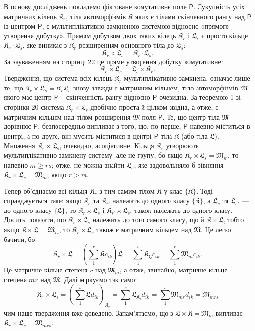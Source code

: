 \documentclass[11pt]{article}
\begin{document}
В основу досліджень покладемо фіксоване комутативне поле \(\mathsf P\). Сукупність усіх матричних кілець \(\mathfrak K_r\), тіла автоморфізмів \(\mathfrak K\) яких є тілами скінченного рангу над \(\mathsf P\) із центром \(\mathsf P\), є мультиплікативно замкненою системою відносно «прямого утворення добутку». Прямим добутком двох таких кілець \(\mathfrak K_r\) і \(\mathfrak L_s\) є просто кільце \(\mathfrak K_r\cdot\mathfrak L_s\), яке виникає з \(\mathfrak K_r\) розширенням основного тіла до \(\mathfrak L_s\):
\[
\mathfrak K_r\times\mathfrak L_s=\mathfrak K_r\cdot\mathfrak L_s.
\]
За зауваженням на сторінці 22 це пряме утворення добутку комутативне:
\[
\mathfrak K_r\times\mathfrak L_s=\mathfrak L_s\times\mathfrak K_r.
\]
Твердження, що система всіх кілець \(\mathfrak K_r\) мультиплікативно замкнена, означає лише те, що \(\mathfrak K_r\times\mathfrak L_s=\mathfrak K_r\mathfrak L_s\) знову завжди є матричним кільцем, тіло автоморфізмів \(\mathfrak M\) якого має центр \(\mathsf P\) -- скінченність рангу відносно \(\mathsf P\) очевидна. За теоремою 1 зі сторінки 20 система \(\mathfrak K_r\times\mathfrak L_s\) двобічно проста й цілком звідна, а отже, є матричним кільцем над тілом розширення \(\mathfrak M\) поля \(\mathsf P\). Те, що центр тіла \(\mathfrak M\) дорівнює \(\mathsf P\), безпосередньо випливає з того, що, по-перше, \(\mathsf P\) напевно міститься в центрі, а по-друге, він мусить міститися в центрі \(\mathsf P\) тіла \(\mathfrak K\) (або тіла \(\mathfrak L\)). Множення \(\mathfrak K_r\times\mathfrak L_s\), очевидно, асоціативне. Кільця \(\mathfrak K_r\) утворюють мультиплікативно замкнену систему, але не групу, бо якщо \(\mathfrak K_r\times\mathfrak L_s=\mathfrak M_m\), то напевно \(m\geq rs\); отже, не можна знайти \(\mathfrak L_s\), яке задовольняло б рівняння \(\mathfrak K_r\times\mathfrak L_s=\mathfrak M_m\), якщо \(r>m\).

Тепер об'єднаємо всі кільця \(\mathfrak K_r\) з тим самим тілом \(\mathfrak K\) у клас \(\{\mathfrak K\}\). Тоді справджується таке: якщо \(\mathfrak K_r\) та \(\mathfrak K_{r'}\) належать до одного класу \(\{\mathfrak K\}\), а \(\mathfrak L_s\) та \(\mathfrak L_{s'}\) --- до одного класу \(\{\mathfrak L\}\), то \(\mathfrak K_r\times\mathfrak L_s\) і \(\mathfrak K_{r'}\times\mathfrak L_{s'}\) також належать до одного класу. Досить показати, що \(\mathfrak K_r\times\mathfrak L_s\) належить до того самого класу, що й \(\mathfrak K\times\mathfrak L\), тобто якщо \(\mathfrak K\times\mathfrak L=\mathfrak M_m\), то \(\mathfrak K_r\times\mathfrak L_s\) також є матричним кільцем над \(\mathfrak M\). Це легко бачити, бо
\[
\mathfrak K_r\times\mathfrak L
=\left(\sum_1^r\mathfrak K c_{ik}\right)\mathfrak L
=\sum_1^r\mathfrak K_{\mathfrak L}c_{ik}
=\sum_1^r\mathfrak M_m c_{ik}.
\]
Це матричне кільце степеня \(r\) над \(\mathfrak M_m\), а отже, звичайно, матричне кільце степеня \(mr\) над \(\mathfrak M\). Далі міркуємо так само:
\[
\mathfrak K_r\times\mathfrak L_s
=\left(\sum_1^s\mathfrak L d_{ik}\right)_{\mathfrak K_r}
=\sum_1^s\mathfrak L_{\mathfrak K_r}d_{ik}
=\sum_1^s\mathfrak M_{mr}d_{ik}
=\mathfrak M_{mrs}
\]
чим наше твердження вже доведено. Запам'ятаємо, що з \(\mathfrak L\times\mathfrak K=\mathfrak M_m\) випливає \(\mathfrak K_r\times\mathfrak L_s=\mathfrak M_{mrs}\).
\end{document}
